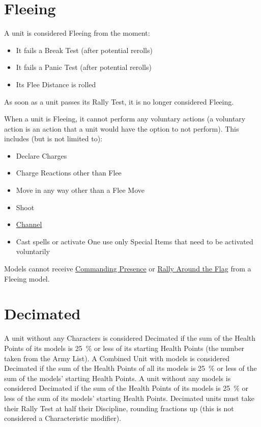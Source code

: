 \section{Fleeing}
\label{fleeing}

A unit is considered Fleeing from the moment:
\begin{itemize}
\item It fails a Break Test (after potential rerolls)
\item It fails a Panic Test (after potential rerolls)
\item Its Flee Distance is rolled
\end{itemize}

As soon as a unit passes its Rally Test, it is no longer considered Fleeing.

When a unit is Fleeing, it cannot perform any voluntary actions (a voluntary action is an action that a unit would have the option to not perform). This includes (but is not limited to):

\begin{itemize}
\item Declare Charges
\item Charge Reactions other than Flee
\item Move in any way other than a Flee Move
\item Shoot
\item \hyperref[channel]{Channel}
\item Cast spells or activate One use only Special Items that need to be activated voluntarily
\end{itemize}

\idx{\commandingpresence{}}Models cannot receive \hyperref[commanding_presence]{Commanding Presence} or \hyperref[rally_around_the_flag]{Rally Around the Flag} from a Fleeing model.

\columnbreak

\section{Decimated}
\label{decimated}

A unit without any Characters is considered Decimated if the sum of the Health Points of its models is \SI{25}{\percent} or less of its starting Health Points (the number taken from the Army List).
A Combined Unit with \rnf{} models is considered Decimated if the sum of the Health Points of all its models is \SI{25}{\percent} or less of the sum of the \rnf{} models' starting Health Points. A unit without any \rnf{} models is considered Decimated if the sum of the Health Points of its models is \SI{25}{\percent} or less of the sum of its models' starting Health Points.
Decimated units must take their Rally Test at half their Discipline, rounding fractions up (this is not considered a Characteristic modifier).

